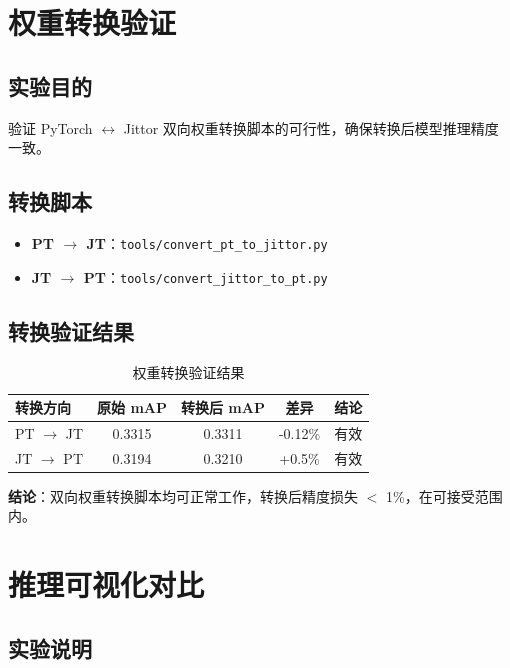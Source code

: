 \documentclass[12pt,a4paper]{article}
\begin{document}
\section{权重转换验证}

\subsection{实验目的}

验证 PyTorch $\leftrightarrow$ Jittor 双向权重转换脚本的可行性，确保转换后模型推理精度一致。

\subsection{转换脚本}

\begin{itemize}
    \item \textbf{PT $\rightarrow$ JT}：\texttt{tools/convert\_pt\_to\_jittor.py}
    \item \textbf{JT $\rightarrow$ PT}：\texttt{tools/convert\_jittor\_to\_pt.py}
\end{itemize}

\subsection{转换验证结果}

\begin{table}[H]
\centering
\caption{权重转换验证结果}
\label{tab:weight_conversion}
\begin{tabular}{lcccc}
\toprule
\textbf{转换方向} & \textbf{原始 mAP} & \textbf{转换后 mAP} & \textbf{差异} & \textbf{结论} \\
\midrule
PT $\rightarrow$ JT & 0.3315 & 0.3311 & -0.12\% & 有效 \\
JT $\rightarrow$ PT & 0.3194 & 0.3210 & +0.5\% & 有效 \\
\bottomrule
\end{tabular}
\end{table}

\textbf{结论}：双向权重转换脚本均可正常工作，转换后精度损失 $<$ 1\%，在可接受范围内。

\section{推理可视化对比}

\subsection{实验说明}
\end{document}
